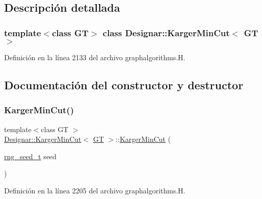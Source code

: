 \subsection{Descripción detallada}
\subsubsection*{template$<$class GT$>$\newline
class Designar\+::\+Karger\+Min\+Cut$<$ G\+T $>$}



Definición en la línea 2133 del archivo graphalgorithms.\+H.



\subsection{Documentación del constructor y destructor}
\mbox{\label{class_designar_1_1_karger_min_cut_ab2b55a4d8b0d64a469cecafeeac8fcf1}} 
\subsubsection{\texorpdfstring{Karger\+Min\+Cut()}{KargerMinCut()}\hspace{0.1cm}{\footnotesize\ttfamily [1/2]}}
{\footnotesize\ttfamily template$<$class GT $>$ \\
\hyperlink{class_designar_1_1_karger_min_cut}{Designar\+::\+Karger\+Min\+Cut}$<$ \hyperlink{demo-buildgraph_8_c_a3001c40d2c31ca87ed96cd7d1334a55e}{GT} $>$\+::\hyperlink{class_designar_1_1_karger_min_cut}{Karger\+Min\+Cut} (\begin{DoxyParamCaption}\item[{\hyperlink{namespace_designar_ad621b5646d45288c5d6a1e1dfe7531a8}{rng\+\_\+seed\+\_\+t}}]{seed }\end{DoxyParamCaption})\hspace{0.3cm}{\ttfamily [inline]}}



Definición en la línea 2205 del archivo graphalgorithms.\+H.

\mbox{\label{class_designar_1_1_karger_min_cut_a1f8bce9bd104fb9b6ba7744c58dbf68b}} 
